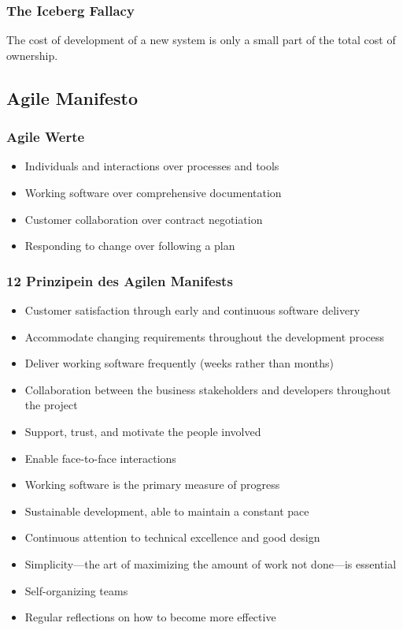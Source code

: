 \subsubsection{The Iceberg Fallacy}
The cost of development of a new system is only a small part of the total cost of ownership.

\subsection{Agile Manifesto}
\subsubsection{Agile Werte}
\begin{itemize}
    \item Individuals and interactions over processes and tools
    \item Working software over comprehensive documentation
    \item Customer collaboration over contract negotiation
    \item Responding to change over following a plan
\end{itemize}

\subsubsection{12 Prinzipein des Agilen Manifests}
\begin{itemize}
    \item Customer satisfaction through early and continuous software delivery
    \item Accommodate changing requirements throughout the development process
    \item Deliver working software frequently (weeks rather than months)
    \item Collaboration between the business stakeholders and developers throughout the project
    \item Support, trust, and motivate the people involved
    \item Enable face-to-face interactions
    \item Working software is the primary measure of progress
    \item Sustainable development, able to maintain a constant pace
    \item Continuous attention to technical excellence and good design
    \item Simplicity—the art of maximizing the amount of work not done—is essential
    \item Self-organizing teams
    \item Regular reflections on how to become more effective
\end{itemize}

